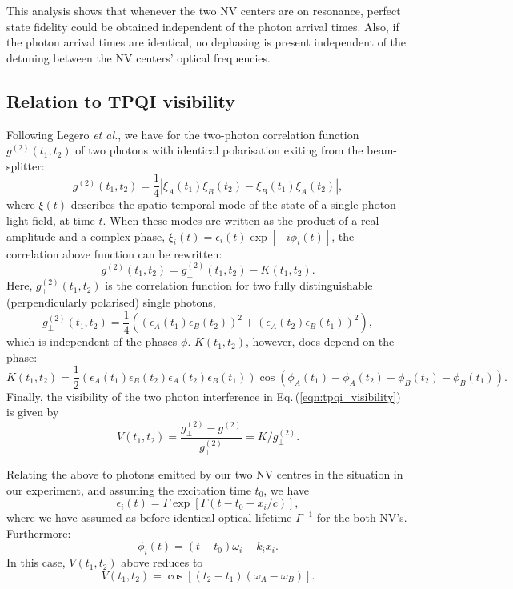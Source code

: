 This analysis shows that whenever the two NV centers are on resonance, perfect state fidelity could be obtained independent of the photon arrival times. Also, if the photon arrival times are identical, no dephasing is present independent of the detuning between the NV centers' optical frequencies.

\subsection{Relation to TPQI visibility}
Following Legero \emph{et al.}\cite{Legero:2006ur}, we have for the two-photon correlation function $g^{(2)}(t_1,t_2)$ of two photons with identical polarisation exiting from the beam-splitter:
\begin{equation}
	g^{(2)}(t_1,t_2)=\frac{1}{4}\left|\xi_A(t_1)\xi_B(t_2)-\xi_B(t_1)\xi_A(t_2)\right|,
\end{equation}
where $\xi(t)$ describes the spatio-temporal mode of the state of a single-photon light field, at time $t$. When these modes are written as the product of a real amplitude and a complex phase, $ \xi_i(t) = \epsilon_i(t) \exp[ - i \phi_i(t)]$, the correlation above function can be rewritten:
\begin{equation}
	g^{(2)}(t_1,t_2)=g^{(2)}_\perp(t_1,t_2) - K(t_1,t_2).
\end{equation}
Here, $g^{(2)}_\perp(t_1,t_2)$ is the correlation function for two fully distinguishable (perpendicularly polarised) single photons,
\begin{equation}
g^{(2)}_\perp(t_1,t_2) = \frac{1}{4}\left((\epsilon_A(t_1)\epsilon_B(t_2))^2 + (\epsilon_A(t_2)\epsilon_B(t_1))^2 \right),
\end{equation}
which is independent of the phases $\phi$. $K(t_1,t_2)$, however, does depend on the phase:
\begin{equation}
K(t_1,t_2) = \frac{1}{2}(\epsilon_A(t_1) \epsilon_B(t_2) \epsilon_A(t_2) \epsilon_B(t_1))\cos(\phi_A(t_1)-\phi_A(t_2) + \phi_B(t_2) - \phi_B(t_1)).
\end{equation}
Finally, the visibility of the two photon interference in Eq.\,(\ref{eqn:tpqi_visibility}) is given by %
\begin{equation}
V(t_1,t_2)=\frac{g^{(2)}_\perp-g^{(2)}}{g^{(2)}_\perp}= K/g^{(2)}_\perp.
\end{equation} 

Relating the above to photons emitted by our two NV centres in the situation in our experiment, and assuming the excitation time $t_0$, we have
\begin{equation}
\epsilon_i(t)=\Gamma\exp[\Gamma(t-t_0-x_i/c)],
\end{equation}
where we have assumed as before identical optical lifetime $\Gamma^{-1}$ for the both NV's. Furthermore:
\begin{equation}
\phi_i(t)=(t-t_0)\omega_i-k_i x_i.
\end{equation}
In this case, $V(t_1,t_2)$ above reduces to 
\begin{equation}
V(t_1,t_2)=\cos[(t_2-t_1)(\omega_A-\omega_B)].
\end{equation}

